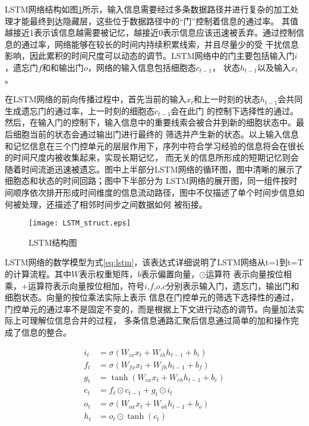 LSTM网络结构如图\ref{fig:lstm}所示，输入信息需要经过多条数据路径并进行复杂的加工处理才能最终到达隐藏层，这些位于数据路径中的“门”控制着信息的通过率。
其值越接近1表示该信息越需要被记忆，越接近0表示信息应该迅速被丢弃。通过控制信息的通过率，网络能够在较长的时间内持续积累线索，并且尽量少的受
干扰信息影响，因此累积的时间尺度可以动态的调节。LSTM网络中的门主要包括输入门\(i\)，遗忘门\(f\)和和输出门\(o\)，网络的输入信息包括细胞态\(c_{t-1}\)，
状态\(h_{t-1}\)以及输入\(x_t\)。

在LSTM网络的前向传播过程中，首先当前的输入\(x_t\)和上一时刻的状态\(h_{t-1}\)会共同生成遗忘门的通过率，上一时刻的细胞态\(c_{t-1}\)会在此门
的控制下选择性的通过。然后，在输入门的控制下，输入信息中的重要线索会被合并到新的细胞状态中。最后细胞当前的状态会通过输出门进行最终的
筛选并产生新的状态。以上输入信息和记忆信息在三个门控单元的层层作用下，序列中符合学习经验的信息将会在很长的时间尺度内被收集起来，实现长期记忆，
而无关的信息所形成的短期记忆则会随着时间流逝迅速被遗忘。图中上半部分LSTM网络的循环图，图中清晰的展示了细胞态和状态的时间回路；图中下半部分为
LSTM网络的展开图，同一组件按时间顺序依次排开形成时间维度的信息流动路径，图中不仅描述了单个时间步信息如何被处理，还描述了相邻时间步之间数据如何
被衔接。

\begin{figure}
	\centering
	\texttt{[image: LSTM\_struct.eps]}
	\caption{LSTM结构图}
	\label{fig:lstm}
\end{figure}

LSTM网络的数学模型为式\ref{eq:lstm}，该表达式详细说明了LSTM网络从t=1到t=T的计算流程。其中\(W\)表示权重矩阵，\(b\)表示偏置向量，\(\odot\)运算符
表示向量按位相乘，\(+\)运算符表示向量按位相加，符号\(i\),\(f\),\(o\),\(c\)分别表示输入门，遗忘门，输出门和细胞状态。向量的按位乘法实际上表示
信息在门控单元的筛选下选择性的通过，门控单元的通过率不是固定不变的，而是根据上下文进行动态的调节。向量加法实际上可理解位信息合并的过程，
多条信息通路汇聚后信息通过简单的加和操作完成了信息的整合。

\begin{equation}\label{eq:lstm}
	\begin{split}
		i_t &= \sigma(W_{ix} x_t + W_{ih} h_{t-1} + b_i)	\\
		f_t &= \sigma(W_{fx} x_t + W_{fh} h_{t-1} + b_f)	\\
		g_t &= \tanh(W_{cx} x_t + W_{ch} h_{t-1} + b_c)					\\
		c_t &= f_t \odot c_{t-1} + g_t \odot i_t							\\	
		o_t &= \sigma(W_{ox} x_{t} + W_{oh} h_{t-1} + b_o)	\\
		h_t &= o_t \odot \tanh(c_{t})											\\												
	\end{split}
\end{equation}


